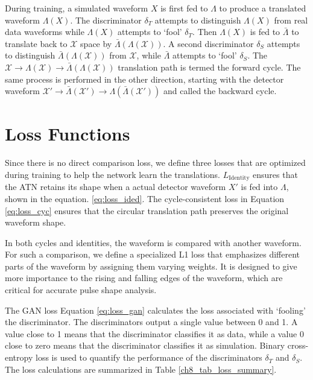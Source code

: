 During training, a simulated waveform $X$ is first fed to $\Lambda$ to produce a translated waveform $\Lambda(X)$. The discriminator $\delta_{T}$ attempts to distinguish $\Lambda(X)$ from real data waveforms while $\Lambda(X)$ attempts to `fool' $\delta_{T}$. Then $\Lambda(X)$ is fed to $\bar{\Lambda}$ to translate back to $\mathcal{X}$ space by $\bar{\Lambda}(\Lambda(\mathcal{X}))$. A second discriminator $\delta_{S}$ attempts to distinguish $\bar{\Lambda}(\Lambda(\mathcal{X}))$ from $\mathcal{X}$, while $\bar{\Lambda}$ attempts to `fool' $\delta_{S}$. The $\mathcal{X}\rightarrow{}\Lambda(\mathcal{X})\rightarrow{}\bar{\Lambda}(\Lambda(\mathcal{X}))$ translation path is termed the forward cycle. The same process is performed in the other direction, starting with the detector waveform $\mathcal{X}'\rightarrow{}\bar{\Lambda}(\mathcal{X}')\rightarrow{}\Lambda(\bar{\Lambda}(\mathcal{X}'))$ and called the backward cycle.

\section{Loss Functions}

Since there is no direct comparison loss, we define three losses that are optimized during training to help the network learn the translations. $L_{\mathrm{Identity}}$ ensures that the ATN retains its shape when a actual detector waveform $X'$ is fed into $\Lambda$, shown in the equation. \ref{eq:loss_ided}. The cycle-consistent loss in Equation \ref{eq:loss_cyc} ensures that the circular translation path preserves the original waveform shape. 

In both cycles and identities, the waveform is compared with another waveform. For such a comparison, we define a specialized L1 loss that emphasizes different parts of the waveform by assigning them varying weights. It is designed to give more importance to the rising and falling edges of the waveform, which are critical for accurate pulse shape analysis.

The GAN loss Equation \ref{eq:loss_gan} calculates the loss associated with `fooling' the discriminator.  The discriminators output a single value between 0 and 1. A value close to 1 means that the discriminator classifies it as data, while a value 0 close to zero means that the discriminator classifies it as simulation. Binary cross-entropy loss is used to quantify the performance of the discriminators $\delta_{T}$ and $\delta_{S}$. The loss calculations are summarized in Table \ref{ch8_tab_loss_summary}.

